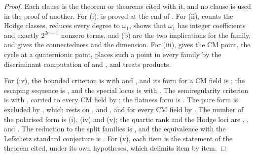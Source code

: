 \begin{proof}
Each clause is the theorem or theorems cited with it, and no clause is used
in the proof of another. For (i), \cite[Theorem~1.1]{paperI} is proved at the end of
\cite[Section~17.3]{paperI}. For (ii), \cite[Theorem~4.14]{paperI} counts the Hodge
classes, \cite[Corollary~4.15]{paperI} reduces every degree to $\omega_{1}$,
\cite[Theorem~4.9(i)]{paperI} shows that $\omega_{1}$ has integer coefficients
and exactly $2^{2n-1}$ nonzero terms, \cite[Theorem~15.14(a)]{paperI} and (b) are the
two implications for the family, and \cite[Proposition~B.8]{paperI} gives the
connectedness and the dimension. For (iii), \cite[Theorem~17.5]{paperI} gives the
CM point, \cite[Theorem~15.25(v)]{paperI} the cycle at a quaternionic point,
\cite[Theorem~15.27]{paperI} places such a point in every family by the
discriminant computation of \cite[Theorem~15.25(iv)]{paperI} and \cite[Lemma~15.26]{paperI},
and \cite[Theorem~15.10]{paperI} treats products.

For (iv), the bounded criterion is \cite[Theorem~16.9]{paperI} with
\cite[Theorem~16.17]{paperI} and \cite[Theorem~16.15]{paperI}, and its form for a CM field
is \cite[Theorem~17.7(iv)]{paperI}; the escaping sequence is \cite[Theorem~17.14]{paperI},
and the special locus is \cite[Proposition~17.12]{paperI} with
\cite[Corollary~17.13]{paperI}. The semiregularity criterion is
 with , carried to every CM field
by \cite[Theorem~17.7(v)]{paperI}; the flatness form is . The
pure form is excluded by , which rests on
,  and
, and for every CM field by
. The number of the polarised form is
(i),
(iv) and (v); the quartic rank and the Hodge loci are
, , 
and . The reduction to the split families is
, and the equivalence with the Lefschetz standard
conjecture is . For (v), each item is the statement of
the theorem cited, under its own hypotheses, which  delimits
item by item.


\end{proof}
